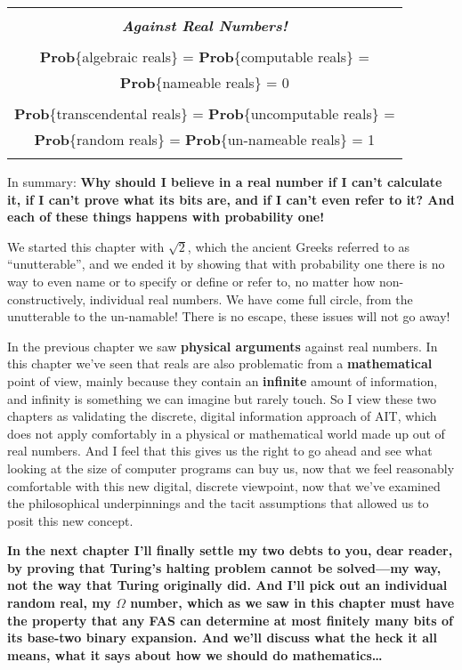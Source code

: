 \documentclass[12pt]{book}
\begin{document}
\begin{center}
\begin{tabular}{|c|}
\hline
\\
\textbf{\emph{\large Against Real Numbers!}}
\\ \\
\textbf{Prob}\{algebraic reals\} = \textbf{Prob}\{computable reals\} = 
\\
\textbf{Prob}\{nameable reals\} = 0
\\ \\
\textbf{Prob}\{transcendental reals\} = \textbf{Prob}\{uncomputable reals\} = 
\\
\textbf{Prob}\{random reals\} = \textbf{Prob}\{un-nameable reals\} = 1
\\
\\
\hline
\end{tabular}
\end{center}
 
In summary:
\textbf{
Why should I believe in a real number if I can't calculate it, if I can't prove
what its bits are, and if I can't even refer to it? 
And each of these things happens with probability one!
}
 
We started this chapter with $\sqrt{2}$, which the ancient Greeks referred to as ``unutterable'',
and we ended it by showing that with probability one there is no way to 
even name or to specify or define or refer to, no matter how non-constructively,
individual real numbers. We have come full circle, from the unutterable to the un-namable!
There is no escape, these issues will not go away!
 
In the previous chapter we saw \textbf{physical arguments} against real numbers.
In this chapter we've seen that reals are also problematic from a \textbf{mathematical} point
of view, mainly because they contain an \textbf{infinite} amount of information, and
infinity is something we can imagine but rarely touch.
So I view these two chapters as validating the discrete, digital information approach of AIT,
which does not apply comfortably in a physical or mathematical world made up out of real numbers.
And I feel that this gives us the right to go ahead and see what looking at the size of
computer programs can buy us, now that we feel reasonably comfortable with this new digital, discrete
viewpoint, now that we've examined the philosophical underpinnings 
and the tacit assumptions
that allowed us to posit this
new concept.
 
\textbf{In the next chapter I'll finally settle my two debts to you, dear reader, by proving that
Turing's halting problem cannot be solved---my way, not the way that Turing originally did.
And I'll pick out an individual random real, my $\Omega$ number, which as we saw in this
chapter must have the property that any FAS can determine at most finitely many bits of its
base-two binary expansion.
And we'll discuss what the heck it all means,
what it says about how we should do mathematics\ldots}
\end{document}
